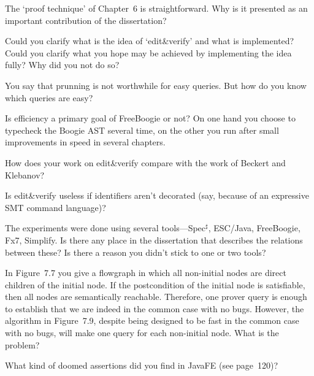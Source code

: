 \Q The `proof technique' of Chapter~6 is straightforward. Why is it
presented as an important contribution of the dissertation?


\Q Could you clarify what is the idea of `edit\&verify' and what is
implemented? Could you clarify what you hope may be achieved by
implementing the idea fully? Why did you not do so?

\Q You say that prunning is not worthwhile for easy queries. But how do you
know which queries are easy?


\Q Is efficiency a primary goal of FreeBoogie or not? On one hand you choose
to typecheck the Boogie AST several time, on the other you run after small
improvements in speed in several chapters.


\Q How does your work on edit\&verify compare with the work of Beckert and
Klebanov?

\Q Is edit\&verify useless if identifiers aren't decorated (say, because of
an expressive SMT command language)?

\Q The experiments were done using several tools---Spec$^\sharp$, ESC/Java,
FreeBoogie, Fx7, Simplify. Is there any place in the dissertation that
describes the relations between these? Is there a reason you didn't stick
to one or two tools?

\Q In Figure~7.7 you give a flowgraph in which all non-initial nodes are
direct children of the initial node. If the postcondition of the initial
node is satisfiable, then all nodes are semantically reachable. Therefore,
one prover query is enough to establish that we are indeed in the common
case with no bugs. However, the algorithm in Figure~7.9, despite being
designed to be fast in the common case with no bugs, will make one query
for each non-initial node. What is the problem?


\Q What kind of doomed assertions did you find in JavaFE (see page~120)?

